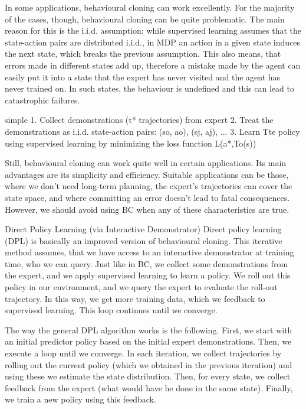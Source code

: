 \documentclass{article}
\begin{document}
	In some applications, behavioural cloning can work excellently. For the majority of the cases, though, behavioural cloning can be quite problematic. The main reason for this is the i.i.d. assumption: while supervised learning assumes that the state-action pairs are distributed i.i.d., in MDP an action in a given state induces the next state, which breaks the previous assumption. This also means, that errors made in different states add up, therefore a mistake made by the agent can easily put it into a state that the expert has never visited and the agent has never trained on. In such states, the behaviour is undefined and this can lead to catastrophic failures.
	
	simple
	1. Collect demonstrations (t* trajectories) from expert
	2. Treat the demonstrations as i.i.d. state-action pairs: (so, ao), (sj, aj), ...
	3. Learn Tte policy using supervised learning by minimizing the loss function
	L(a*,To(s))
	
	Still, behavioural cloning can work quite well in certain applications. Its main advantages are its simplicity and efficiency. Suitable applications can be those, where we don’t need long-term planning, the expert’s trajectories can cover the state space, and where committing an error doesn’t lead to fatal consequences. However, we should avoid using BC when any of these characteristics are true.
	
	Direct Policy Learning (via Interactive Demonstrator)
	Direct policy learning (DPL) is basically an improved version of behavioural cloning. This iterative method assumes, that we have access to an interactive demonstrator at training time, who we can query. Just like in BC, we collect some demonstrations from the expert, and we apply supervised learning to learn a policy. We roll out this policy in our environment, and we query the expert to evaluate the roll-out trajectory. In this way, we get more training data, which we feedback to supervised learning. This loop continues until we converge.
	
	The way the general DPL algorithm works is the following. First, we start with an initial predictor policy based on the initial expert demonstrations. Then, we execute a loop until we converge. In each iteration, we collect trajectories by rolling out the current policy (which we obtained in the previous iteration) and using these we estimate the state distribution. Then, for every state, we collect feedback from the expert (what would have he done in the same state). Finally, we train a new policy using this feedback.
	
\end{document}
